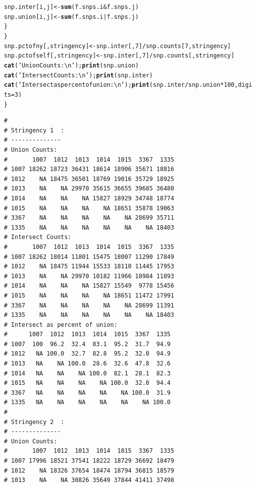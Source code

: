 \documentclass{article}\usepackage[]{graphicx}\usepackage[]{color}
\makeatletter
\newcommand{\hlnum}[1]{\textcolor[rgb]{0.686,0.059,0.569}{#1}}%
\newcommand{\hlstr}[1]{\textcolor[rgb]{0.192,0.494,0.8}{#1}}%
\newcommand{\hlopt}[1]{\textcolor[rgb]{0,0,0}{#1}}%
\newcommand{\hlstd}[1]{\textcolor[rgb]{0.345,0.345,0.345}{#1}}%
\newcommand{\hlkwb}[1]{\textcolor[rgb]{0.69,0.353,0.396}{#1}}%
\newcommand{\hlkwc}[1]{\textcolor[rgb]{0.333,0.667,0.333}{#1}}%
\newcommand{\hlkwd}[1]{\textcolor[rgb]{0.737,0.353,0.396}{\textbf{#1}}}%
\newenvironment{kframe}{%
 \def\at@end@of@kframe{}%
 \ifinner\ifhmode%
  \def\at@end@of@kframe{\end{minipage}}%
  \begin{minipage}{\columnwidth}%
 \fi\fi%
 \def\FrameCommand##1{\hskip\@totalleftmargin \hskip-\fboxsep
 \colorbox{shadecolor}{##1}\hskip-\fboxsep
     \hskip-\linewidth \hskip-\@totalleftmargin \hskip\columnwidth}%
 \MakeFramed {\advance\hsize-\width
   \@totalleftmargin\z@ \linewidth\hsize
   \@setminipage}}%
 {\par\unskip\endMakeFramed%
 \at@end@of@kframe}
\newenvironment{knitrout}{}{} %
\makeatother
\begin{document}
\begin{knitrout}
\begin{kframe}
\begin{alltt}
      \hlstd{snp.inter[i,j]} \hlkwb{<-} \hlkwd{sum}\hlstd{(f.snps.i} \hlopt{&} \hlstd{f.snps.j)}
      \hlstd{snp.union[i,j]} \hlkwb{<-} \hlkwd{sum}\hlstd{(f.snps.i} \hlopt{|} \hlstd{f.snps.j)}
    \hlstd{\}}
  \hlstd{\}}
  \hlstd{snp.pctofny  [,stringency]} \hlkwb{<-} \hlstd{snp.inter[,}\hlnum{7}\hlstd{]}\hlopt{/}\hlstd{snp.counts[}\hlnum{7}\hlstd{,stringency]}
  \hlstd{snp.pctofself[,stringency]} \hlkwb{<-} \hlstd{snp.inter[,}\hlnum{7}\hlstd{]}\hlopt{/}\hlstd{snp.counts[ ,stringency]}
  \hlkwd{cat}\hlstd{(}\hlstr{'Union Counts:\textbackslash{}n'}\hlstd{);}                  \hlkwd{print}\hlstd{(snp.union)}
  \hlkwd{cat}\hlstd{(}\hlstr{'Intersect Counts:\textbackslash{}n'}\hlstd{);}              \hlkwd{print}\hlstd{(snp.inter)}
  \hlkwd{cat}\hlstd{(}\hlstr{'Intersect as percent of union:\textbackslash{}n'}\hlstd{);} \hlkwd{print}\hlstd{(snp.inter}\hlopt{/}\hlstd{snp.union}\hlopt{*}\hlnum{100}\hlstd{,}\hlkwc{digits}\hlstd{=}\hlnum{3}\hlstd{)}
\hlstd{\}}
\end{alltt}
\begin{verbatim}
# 
# Stringency 1  :
# --------------
# Union Counts:
#       1007  1012  1013  1014  1015  3367  1335
# 1007 18262 18723 36431 18614 18906 35671 18816
# 1012    NA 18475 36501 18769 19016 35729 18925
# 1013    NA    NA 29970 35615 36655 39685 36480
# 1014    NA    NA    NA 15827 18929 34748 18774
# 1015    NA    NA    NA    NA 18651 35878 19063
# 3367    NA    NA    NA    NA    NA 28699 35711
# 1335    NA    NA    NA    NA    NA    NA 18403
# Intersect Counts:
#       1007  1012  1013  1014  1015  3367  1335
# 1007 18262 18014 11801 15475 18007 11290 17849
# 1012    NA 18475 11944 15533 18110 11445 17953
# 1013    NA    NA 29970 10182 11966 18984 11893
# 1014    NA    NA    NA 15827 15549  9778 15456
# 1015    NA    NA    NA    NA 18651 11472 17991
# 3367    NA    NA    NA    NA    NA 28699 11391
# 1335    NA    NA    NA    NA    NA    NA 18403
# Intersect as percent of union:
#      1007  1012  1013  1014  1015  3367  1335
# 1007  100  96.2  32.4  83.1  95.2  31.7  94.9
# 1012   NA 100.0  32.7  82.8  95.2  32.0  94.9
# 1013   NA    NA 100.0  28.6  32.6  47.8  32.6
# 1014   NA    NA    NA 100.0  82.1  28.1  82.3
# 1015   NA    NA    NA    NA 100.0  32.0  94.4
# 3367   NA    NA    NA    NA    NA 100.0  31.9
# 1335   NA    NA    NA    NA    NA    NA 100.0
# 
# Stringency 2  :
# --------------
# Union Counts:
#       1007  1012  1013  1014  1015  3367  1335
# 1007 17996 18521 37541 18222 18729 36692 18479
# 1012    NA 18326 37654 18474 18794 36815 18579
# 1013    NA    NA 30826 35649 37844 41411 37498

\end{verbatim}
\end{kframe}
\end{knitrout}
\end{document}
